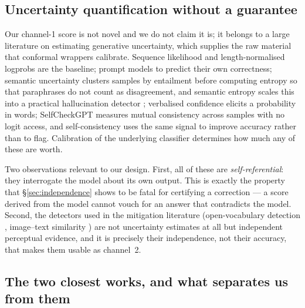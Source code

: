 \documentclass{article}
\theoremstyle{plain}
\theoremstyle{definition}
\theoremstyle{remark}
\begin{document}
\subsection{Uncertainty quantification without a guarantee}
\label{sec:rel:uq}

Our channel-1 score is not novel and we do not claim it is; it belongs to a large
literature on estimating generative uncertainty, which supplies the raw material that
conformal wrappers calibrate. Sequence likelihood and length-normalised logprobs are the
baseline; \citet{kadavath2022} prompt models to predict their own correctness; semantic
uncertainty \citep{kuhn2023} clusters samples by entailment before computing entropy so that
paraphrases do not count as disagreement, and semantic entropy scales this into a practical
hallucination detector \citep{farquhar2024}; verbalised confidence \citep{lin2022} elicits a
probability in words; SelfCheckGPT \citep{manakul2023} measures mutual consistency across
samples with no logit access, and self-consistency \citep{wang2023selfconsistency} uses the
same signal to improve accuracy rather than to flag. Calibration of the underlying classifier
\citep{guo2017} determines how much any of these are worth.

Two observations relevant to our design. First, all of these are \emph{self-referential}:
they interrogate the model about its own output. This is exactly the property that
\S\ref{sec:independence} shows to be fatal for certifying a correction --- a score
derived from the model cannot vouch for an answer that contradicts the model. Second, the
detectors used in the mitigation literature (open-vocabulary detection
\citep{owlv2,liu2024groundingdino}, image--text similarity \citep{clip}) are not
uncertainty estimates at all but independent perceptual evidence, and it is precisely their
independence, not their accuracy, that makes them usable as channel~2.

\subsection{The two closest works, and what separates us from them}
\label{sec:rel:position}
\end{document}
